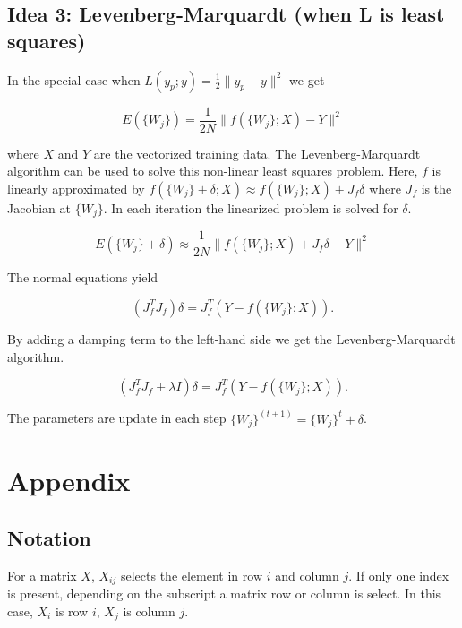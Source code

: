 \documentclass[english,11pt,a4paper]{article}
\begin{document}
\subsection{Idea 3: Levenberg-Marquardt (when L is least squares)}

In the special case when $L(y_p;y) = \frac{1}{2} \|y_p - y\|^2$ we get

\begin{equation}
	E(\{W_j\}) = \frac{1}{2N} \|f(\{W_j\};X) - Y\|^2
\end{equation}

where $X$ and $Y$ are the vectorized training data. The Levenberg-Marquardt algorithm can be used to solve this non-linear least squares problem. Here, $f$ is linearly approximated by $f(\{W_j\}+\delta;X) \approx f(\{W_j\};X) + J_f\delta$ where $J_f$ is the Jacobian at $\{W_j\}$. In each iteration the linearized problem is solved for $\delta$.

\begin{equation}
	E(\{W_j\}+\delta) \approx \frac{1}{2N} \|f(\{W_j\};X) + J_f\delta - Y\|^2
\end{equation}

The normal equations yield

\begin{equation}
	(J_f^TJ_f) \delta = J_f^T(Y - f(\{W_j\};X)).
\end{equation}

By adding a damping term to the left-hand side we get the Levenberg-Marquardt algorithm.

\begin{equation}
	(J_f^TJ_f + \lambda I) \delta = J_f^T(Y - f(\{W_j\};X)).
\end{equation}

The parameters are update in each step $\{W_j\}^{(t+1)} = \{W_j\}^t + \delta$.

\section{Appendix}

\subsection{Notation}

For a matrix $X$, $X_{ij}$ selects the element in row $i$ and column $j$. If only one index is present, depending on the subscript a matrix row or column is select. In this case, $X_i$ is row $i$, $X_j$ is column $j$.
\end{document}

